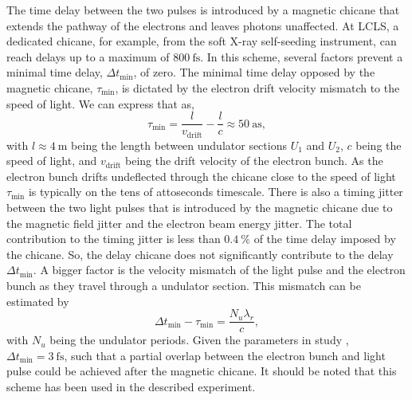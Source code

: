 %
The time delay between the two pulses is introduced by a magnetic chicane that extends the pathway of the electrons and leaves photons unaffected. At LCLS, a dedicated chicane, for example, from the soft X-ray self-seeding instrument, can reach delays up to a maximum of $\SI{800}{\femto\second}$.
In this scheme, several factors prevent a minimal time delay, $\Delta t_{\text{min}}$, of zero. The minimal time delay opposed by the magnetic chicane, $\tau_{\text{min}}$, is dictated by the electron drift velocity mismatch to the speed of light. We can express that as,
\begin{equation}
\tau_{\text{min}} = \frac{l}{v_{\text{drift}}} - \frac{l}{c}\approx \SI{50}{\atto\second},
\label{eq:alberto-delta-t-min}
\end{equation}
with $l\approx \SI{4}{\meter}$ being the length between undulator sections $U_{1}$ and $U_{2}$, $c$ being the speed of light, and $v_{\text{drift}}$ being the drift velocity of the electron bunch. As the electron bunch drifts undeflected through the chicane close to the speed of light $\tau_{\text{min}}$ is typically on the tens of attoseconds timescale.
There is also a timing jitter between the two light pulses that is introduced by the magnetic chicane due to the magnetic field jitter and the electron beam energy jitter. The total contribution to the timing jitter is less than $\SI{0.4}{\percent}$ of the time delay imposed by the chicane. So, the delay chicane does not significantly contribute to the delay $\Delta t_{\text{min}}$. A bigger factor is the velocity mismatch of the light pulse and the electron bunch as they travel through a undulator section. This mismatch can be estimated by
\begin{equation}
\Delta t_{\text{min}}-\tau_{\text{min}}=\frac{N_{u} \lambda_{r}}{c},
\label{eq:alberto-beam-missmatch}
\end{equation}
with $N_{u}$ being the undulator periods. Given the parameters in study \citep{Lutman-2013-PRL}, $\Delta t_{\text{min}}=\SI{3}{\femto\second}$, such that a partial overlap between the electron bunch and light pulse could be achieved after the magnetic chicane. It should be noted that this scheme has been used in the described experiment.\\[1\baselineskip]
%
